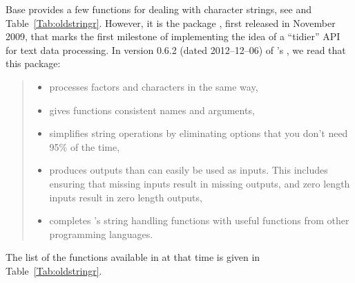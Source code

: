 \documentclass[nojss]{jss}
\begin{document}
Base  \citep{Rproject:home} provides a few functions for dealing
with character strings, see \citep[Chapter~8]{Chambers2008:SoftDA}
and Table~\ref{Tab:oldstringr}.
However, it is the   package \citep{Wickham2010:stringr},
first released in November 2009, that marks the first milestone of
implementing
the idea of a ``tidier'' API for text data processing.
In version 0.6.2 (dated 2012--12--06)
of 's , we read that this package:
\begin{quote}\it
\begin{itemize}
\item processes factors and characters in the same way,
\item gives functions consistent names and arguments,
\item simplifies string operations by eliminating options that you
don't need 95\% of the time,
\item produces outputs than can easily be used as inputs.
This includes ensuring that missing inputs result in missing outputs,
and zero length inputs result in zero length outputs,
\item completes 's string handling functions with
useful functions from other programming languages.
\end{itemize}
\end{quote}
The list of the functions available in  at that time
is given in Table~\ref{Tab:oldstringr}.
\end{document}
